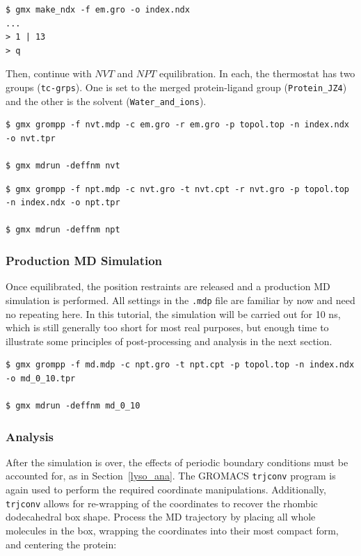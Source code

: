 \documentclass[9pt,tutorial,pubversion]{livecoms}
\begin{document}
\begin{lstlisting}
$ gmx make_ndx -f em.gro -o index.ndx
...
> 1 | 13
> q
\end{lstlisting}

Then, continue with $NVT$ and $NPT$ equilibration. In each, the thermostat has two groups (\texttt{tc-grps}). One is set to the merged protein-ligand group (\texttt{Protein\_JZ4}) and the other is the solvent (\texttt{Water\_and\_ions}).

\begin{lstlisting}
$ gmx grompp -f nvt.mdp -c em.gro -r em.gro -p topol.top -n index.ndx -o nvt.tpr

$ gmx mdrun -deffnm nvt
\end{lstlisting}

\begin{lstlisting}
$ gmx grompp -f npt.mdp -c nvt.gro -t nvt.cpt -r nvt.gro -p topol.top -n index.ndx -o npt.tpr

$ gmx mdrun -deffnm npt
\end{lstlisting}

\subsubsection{Production MD Simulation} \label{complex_md}

Once equilibrated, the position restraints are released and a production MD simulation is performed. All settings in the \texttt{.mdp} file are familiar by now and need no repeating here. In this tutorial, the simulation will be carried out for 10 ns, which is still generally too short for most real purposes, but enough time to illustrate some principles of post-processing and analysis in the next section.

\begin{lstlisting}
$ gmx grompp -f md.mdp -c npt.gro -t npt.cpt -p topol.top -n index.ndx -o md_0_10.tpr

$ gmx mdrun -deffnm md_0_10
\end{lstlisting}

\subsubsection{Analysis} \label{complex_analysis}

After the simulation is over, the effects of periodic boundary conditions must be accounted for, as in Section~\ref{lyso_ana}. The GROMACS \texttt{trjconv} program is again used to perform the required coordinate manipulations. Additionally, \texttt{trjconv} allows for re-wrapping of the coordinates to recover the rhombic dodecahedral box shape. Process the MD trajectory by placing all whole molecules in the box, wrapping the coordinates into their most compact form, and centering the protein:
\end{document}
